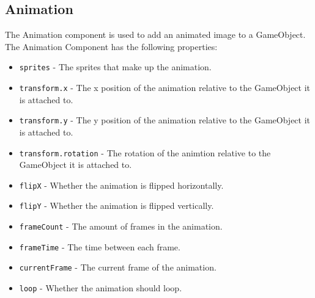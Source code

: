 \subsection{Animation}
The Animation component is used to add an animated image to a GameObject.
The Animation Component has the following properties:
\begin{itemize}
    \item \texttt{sprites} - The sprites that make up the animation.
    \item \texttt{transform.x} - The x position of the animation relative to the GameObject it is attached to.
    \item \texttt{transform.y} - The y position of the animation relative to the GameObject it is attached to.
    \item \texttt{transform.rotation} - The rotation of the animtion relative to the GameObject it is attached to.
    \item \texttt{flipX} - Whether the animation is flipped horizontally.
    \item \texttt{flipY} - Whether the animation is flipped vertically.
    \item \texttt{frameCount} - The amount of frames in the animation.
    \item \texttt{frameTime} - The time between each frame.
    \item \texttt{currentFrame} - The current frame of the animation.
    \item \texttt{loop} - Whether the animation should loop.
\end{itemize}

